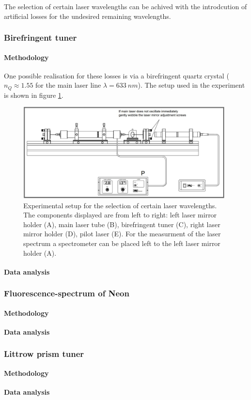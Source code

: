 \documentclass[../main.tex]{subfiles}
\begin{document}
The selection of certain laser wavelengths can be achived with the introdcution of artificial losses for the undesired remaining wavelengths.

\subsubsection{Birefringent tuner}
    \paragraph{Methodology}
        One possible realisation for these losses is via a birefringent quartz crystal ($n_Q \approx\num{1.55}$ for the main laser line $\lambda = \SI{633}{nm}$). The setup used in the experiment is shown in figure \ref{fig:6-Aufbau}.

        \begin{figure}[H]
            \centering 
            \includegraphics[width = 11cm]{Bilddateien/6-Aufbau.jpg}
            \caption{ Experimental setup for the selection of certain laser wavelengths. The components displayed are from left to right: left laser mirror holder (A), main laser tube (B), birefringent tuner (C), right laser mirror holder (D), pilot laser (E). For the measurment of the laser spectrum a spectrometer can be placed left to the left laser mirror holder (A).}
            \label{fig:6-Aufbau}
        \end{figure}

    \paragraph{Data analysis}

\subsubsection{Fluorescence-spectrum of Neon}
    \paragraph{Methodology}
    \paragraph{Data analysis}

\subsubsection{Littrow prism tuner}
    \paragraph{Methodology}
    \paragraph{Data analysis}
\end{document}
